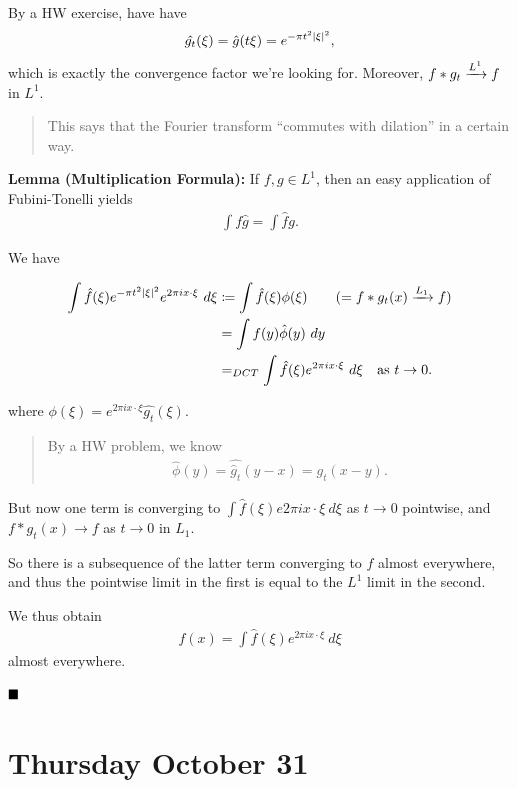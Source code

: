 By a HW exercise, have have
\begin{align*}
\hat{g_t}(\xi) = \hat{g}(t\xi) = e^{-\pi t^2 {\left\lvert {\xi} \right\rvert}^2}
,\end{align*} which is exactly the convergence factor we're looking for.
Moreover, \(f \ast g_t \xrightarrow{L^1} f\) in \(L^1\).

\begin{quote}
This says that the Fourier transform ``commutes with dilation'' in a
certain way.
\end{quote}

\textbf{Lemma (Multiplication Formula):} If \(f, g \in L^1\), then an
easy application of Fubini-Tonelli yields
\begin{align*}
\int f \hat{g} = \int \hat{f} g.
\end{align*}

We have

\begin{align*}
\int \hat{f}(\xi) e^{-\pi t^2 {\left\lvert {\xi} \right\rvert}^2} e^{2\pi i x \cdot \xi} ~d\xi 
&\coloneqq 
\int \hat{f}(\xi) \phi(\xi) \quad \quad (= f \ast g_t(x) \xrightarrow{L_1} f) \\
&= \int f(y) \hat{\phi}(y)~dy \\
&=_{DCT} \int \hat{f}(\xi) e^{2\pi i x \cdot \xi} ~d\xi 
\quad \text{as } t\to 0
.\end{align*}

where \(\phi(\xi) = e^{2\pi i x\cdot \xi} \hat{g_t}(\xi)\).

\begin{quote}
By a HW problem, we know
\begin{align*}
\hat{\phi}(y) = \hat{\hat{g}_t}(y-x) =  g_t(x - y)
.\end{align*}
\end{quote}

But now one term is converging to
\(\int \hat{f}(\xi) e{2\pi i x\cdot \xi} ~d\xi\) as \(t\to 0\)
pointwise, and \(f\ast g_t(x) \to f\) as \(t\to 0\) in \(L_1\).

So there is a subsequence of the latter term converging to \(f\) almost
everywhere, and thus the pointwise limit in the first is equal to the
\(L^1\) limit in the second.

We thus obtain
\begin{align*}
f(x) = \int \hat{f}(\xi) e^{2\pi i x\cdot \xi} ~d\xi
\end{align*} almost everywhere.

\(\qed\)

\hypertarget{thursday-october-31}{%
\section{Thursday October 31}\label{thursday-october-31}}

